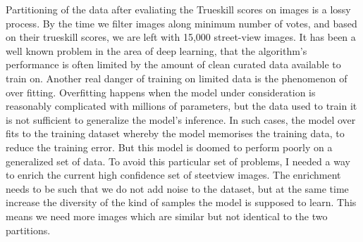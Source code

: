 Partitioning of the data after evaliating the Trueskill scores on images is a lossy process. By the time we filter images along minimum number of votes, and based on their trueskill scores, we are left with 15,000 street-view images. It has been a well known problem in the area of deep learning, that the algorithm's performance is often limited by the amount of clean curated data available to train on. Another real danger of training on limited data is the phenomenon of over fitting. Overfitting happens when the model under consideration is reasonably complicated with millions of parameters, but the data used to train it is not sufficient to generalize the model's inference. In such cases, the model over fits to the training dataset whereby the model memorises the training data, to reduce the training error. But this model is doomed to perform poorly on a generalized set of data. To avoid this particular set of problems, I needed a way to enrich the current high confidence set of steetview images. The enrichment needs to be such that we do not add noise to the dataset, but at the same time increase the diversity of the kind of samples the model is supposed to learn. This means we need more images which are similar but not identical to the two partitions. 

